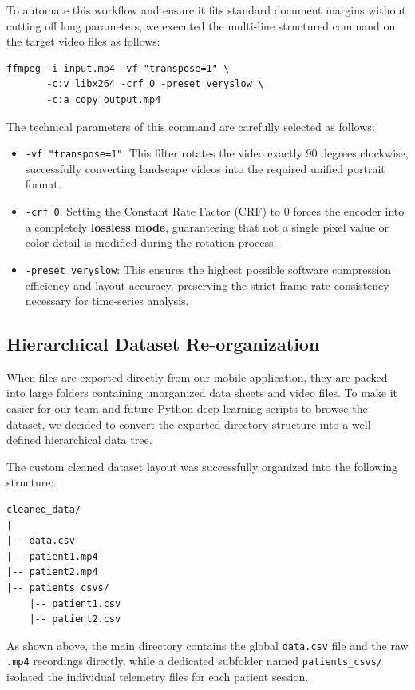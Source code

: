 To automate this workflow and ensure it fits standard document margins without cutting off long parameters, we executed the multi-line structured command on the target video files as follows:

\begin{verbatim}
ffmpeg -i input.mp4 -vf "transpose=1" \
       -c:v libx264 -crf 0 -preset veryslow \
       -c:a copy output.mp4
\end{verbatim}

The technical parameters of this command are carefully selected as follows:
\begin{itemize}
    \item \texttt{-vf "transpose=1"}: This filter rotates the video exactly 90 degrees clockwise, successfully converting landscape videos into the required unified portrait format.
    \item \texttt{-crf 0}: Setting the Constant Rate Factor (CRF) to 0 forces the encoder into a completely \textbf{lossless mode}, guaranteeing that not a single pixel value or color detail is modified during the rotation process.
    \item \texttt{-preset veryslow}: This ensures the highest possible software compression efficiency and layout accuracy, preserving the strict frame-rate consistency necessary for time-series analysis.
\end{itemize}

\subsection{Hierarchical Dataset Re-organization}
When files are exported directly from our mobile application, they are packed into large folders containing unorganized data sheets and video files. To make it easier for our team and future Python deep learning scripts to browse the dataset, we decided to convert the exported directory structure into a well-defined hierarchical data tree.

\newpage

The custom cleaned dataset layout was successfully organized into the following structure:
\begin{verbatim}
cleaned_data/
|
|-- data.csv
|-- patient1.mp4
|-- patient2.mp4
|-- patients_csvs/
    |-- patient1.csv
    |-- patient2.csv
\end{verbatim}

As shown above, the main directory contains the global \texttt{data.csv} file and the raw \texttt{.mp4} recordings directly, while a dedicated subfolder named \texttt{patients\_csvs/} isolated the individual telemetry files for each patient session.

